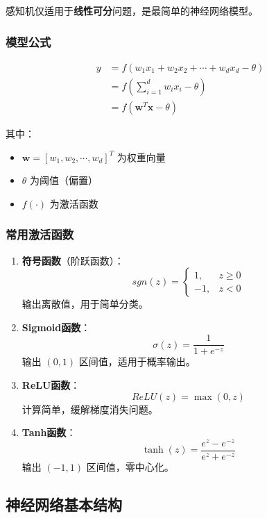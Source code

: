 \documentclass[12pt,a4paper]{ctexart}
\begin{document}
感知机仅适用于\textbf{线性可分}问题，是最简单的神经网络模型。

\subsubsection{模型公式}

\begin{align}
y &= f\left(w_1x_1 + w_2x_2 + \cdots + w_dx_d - \theta\right) \\
&= f\left(\sum_{i=1}^{d} w_ix_i - \theta\right) \\
&= f\left(\mathbf{w}^T\mathbf{x} - \theta\right)
\end{align}

其中：
\begin{itemize}
    \item $\mathbf{w} = [w_1, w_2, \cdots, w_d]^T$ 为权重向量
    \item $\theta$ 为阈值（偏置）
    \item $f(\cdot)$ 为激活函数
\end{itemize}

\subsubsection{常用激活函数}

\begin{enumerate}
    \item \textbf{符号函数}（阶跃函数）：
    \[
    sgn(z) = \begin{cases} 1, & z \geq 0 \\ -1, & z < 0 \end{cases}
    \]
    输出离散值，用于简单分类。
    
    \item \textbf{Sigmoid函数}：
    \[
    \sigma(z) = \frac{1}{1 + e^{-z}}
    \]
    输出 $(0, 1)$ 区间值，适用于概率输出。
    
    \item \textbf{ReLU函数}：
    \[
    ReLU(z) = \max(0, z)
    \]
    计算简单，缓解梯度消失问题。
    
    \item \textbf{Tanh函数}：
    \[
    \tanh(z) = \frac{e^z - e^{-z}}{e^z + e^{-z}}
    \]
    输出 $(-1, 1)$ 区间值，零中心化。
\end{enumerate}

\subsection{神经网络基本结构}
\end{document}
